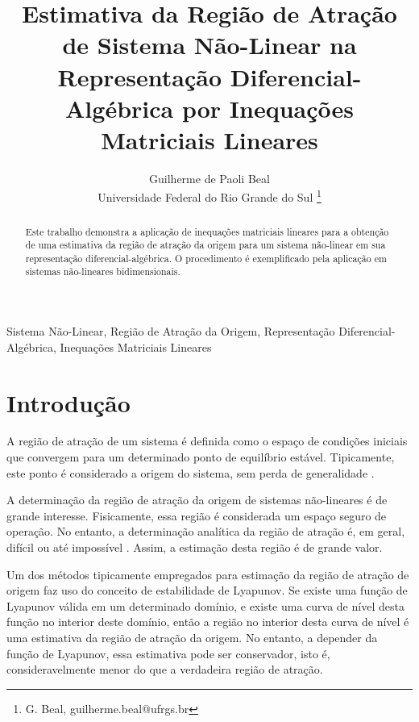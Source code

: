 \documentclass{ppgeesa}
\begin{document}

\title{Estimativa da Região de Atração de Sistema Não-Linear na Representação Diferencial-Algébrica por Inequações Matriciais Lineares}
\author{Guilherme de Paoli Beal
  \\
  {\small Universidade Federal do Rio Grande do Sul}
  \thanks{G. Beal, guilherme.beal@ufrgs.br}
}
\maketitle
\thispagestyle{empty}\pagestyle{empty}

\begin{abstract}
  Este trabalho demonstra a aplicação de inequações matriciais lineares para a obtenção de uma estimativa da região de atração da origem para um sistema não-linear em sua representação diferencial-algébrica.
  O procedimento é exemplificado pela aplicação em sistemas não-lineares bidimensionais.
\end{abstract}

\begin{IEEEkeywords}
  Sistema Não-Linear,
  Região de Atração da Origem,
  Representação Diferencial-Algébrica,
  Inequações Matriciais Lineares
\end{IEEEkeywords}

\section{Introdução}
A região de atração de um sistema é definida como o espaço de condições iniciais que convergem para um determinado ponto de equilíbrio estável.
Tipicamente, este ponto é considerado a origem do sistema, sem perda de generalidade \cite{book:Khalil2002}.

A determinação da região de atração da origem de sistemas não-lineares é de grande interesse.
Fisicamente, essa região é considerada um espaço seguro de operação.
No entanto, a determinação analítica da região de atração é, em geral, difícil ou até impossível \cite{book:Khalil2002}.
Assim, a estimação desta região é de grande valor.

Um dos métodos tipicamente empregados para estimação da região de atração de origem faz uso do conceito de estabilidade de Lyapunov.
Se existe uma função de Lyapunov válida em um determinado domínio, e existe uma curva de nível desta função no interior deste domínio, então a região no interior desta curva de nível é uma estimativa da região de atração da origem.
No entanto, a depender da função de Lyapunov, essa estimativa pode ser conservador, isto é, consideravelmente menor do que a verdadeira região de atração.
\end{document}
